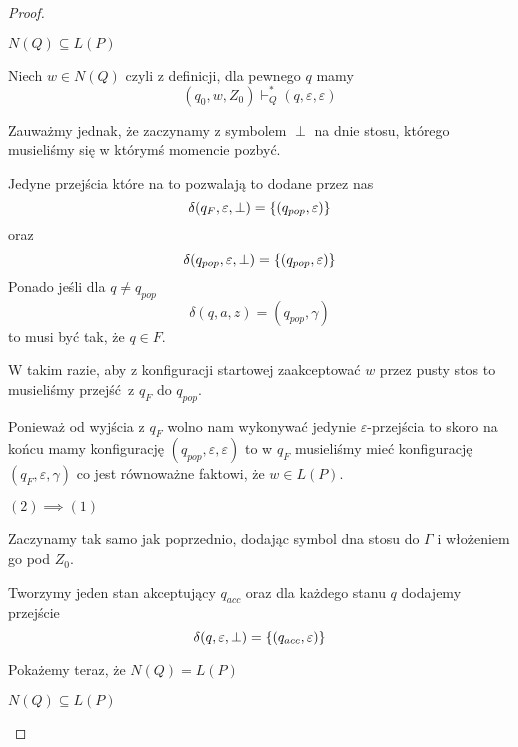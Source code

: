 \begin{proof}
\begin{description}
\begin{description}
            \item \( N(Q) \subseteq L(P) \)
            
            Niech \( w \in N(Q) \) czyli z definicji, dla pewnego \( q \) mamy
            \[
                (q_0, w, Z_0) \vdash_Q^* (q, \varepsilon, \varepsilon)
            \]
            
            Zauważmy jednak, że zaczynamy z symbolem \( \perp \) na dnie stosu, którego musieliśmy się w którymś momencie pozbyć.
            
            Jedyne przejścia które na to pozwalają to dodane przez nas
            \[
                \delta(q_F, \varepsilon, \perp) = \set{(q_{pop}, \varepsilon)}
            \]
            oraz
            \[
                \delta(q_{pop}, \varepsilon, \perp) = \set{(q_{pop}, \varepsilon)}
            \]
            Ponado jeśli dla \( q \neq q_{pop} \)
            \[
                \delta(q, a, z) = {(q_{pop}, \gamma)}
            \]
            to musi być tak, że \( q \in F \).
            
            W takim razie, aby z konfiguracji startowej zaakceptować \( w \) przez pusty stos to musieliśmy przejść z \( q_F \) do \( q_{pop} \).
            
            Ponieważ od wyjścia z \( q_F \) wolno nam wykonywać jedynie \(\varepsilon\)-przejścia to skoro na końcu mamy konfigurację \( (q_{pop}, \varepsilon, \varepsilon) \) to w \( q_F \) musieliśmy mieć konfigurację \( (q_F, \varepsilon, \gamma) \) co jest równoważne faktowi, że \( w \in L(P) \).
            
            
        \end{description}
        
        \item \( (2) \implies (1) \)
        
        Zaczynamy tak samo jak poprzednio, dodając symbol dna stosu do \( \Gamma \) i włożeniem go pod \( Z_0 \).
        
        Tworzymy jeden stan akceptujący \( q_{acc} \) oraz dla każdego stanu \( q \) dodajemy przejście
        \[
            \delta(q, \varepsilon, \perp) = \set{(q_{acc}, \varepsilon)}
        \]
        
        Pokażemy teraz, że \( N(Q) = L(P) \)
        
        \begin{description}
            \item \( N(Q) \subseteq L(P) \)
            

\end{description}
\end{description}
\end{proof}
